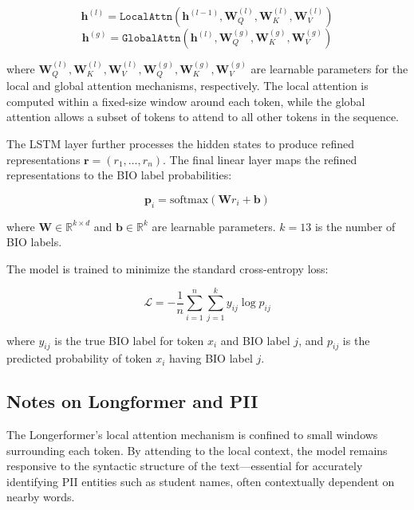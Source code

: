 \documentclass[11pt]{article}
\begin{document}
\begin{equation*}
\mathbf{h}^{(l)} = \texttt{LocalAttn}(\mathbf{h}^{(l-1)}, \mathbf{W}_Q^{(l)}, \mathbf{W}_K^{(l)}, \mathbf{W}_V^{(l)})
\end{equation*}
\begin{equation*}
\mathbf{h}^{(g)} = \texttt{GlobalAttn}(\mathbf{h}^{(l)}, \mathbf{W}_Q^{(g)}, \mathbf{W}_K^{(g)}, \mathbf{W}_V^{(g)})
\end{equation*}

where $\mathbf{W}_Q^{(l)}, \mathbf{W}_K^{(l)}, \mathbf{W}_V^{(l)}, \mathbf{W}_Q^{(g)}, \mathbf{W}_K^{(g)}, \mathbf{W}_V^{(g)}$ are learnable parameters for the local and global attention mechanisms, respectively. The local attention is computed within a fixed-size window around each token, while the global attention allows a subset of tokens to attend to all other tokens in the sequence.

The LSTM layer further processes the hidden states to produce refined representations $\mathbf{r} = (r_1, \ldots, r_n)$. The final linear layer maps the refined representations to the BIO label probabilities:

\begin{equation*}
\mathbf{p}_i = \text{softmax}(\mathbf{W}r_i + \mathbf{b})
\end{equation*}

where $\mathbf{W} \in \mathbb{R}^{k \times d}$ and $\mathbf{b} \in \mathbb{R}^k$ are learnable parameters. $k=13$ is the number of BIO labels.

The model is trained to minimize the standard cross-entropy loss:

\begin{equation*}
\mathcal{L} = -\frac{1}{n} \sum_{i=1}^n \sum_{j=1}^k y_{ij} \log p_{ij}
\end{equation*}

where $y_{ij}$ is the true BIO label for token $x_i$ and BIO label $j$, and $p_{ij}$ is the predicted probability of token $x_i$ having BIO label $j$.


\subsection{Notes on Longformer and PII}

The Longerformer's local attention mechanism is confined to small windows surrounding each token. By attending to the local context, the model remains responsive to the syntactic structure of the text—essential for accurately identifying PII entities such as student names, often contextually dependent on nearby words.
\end{document}
